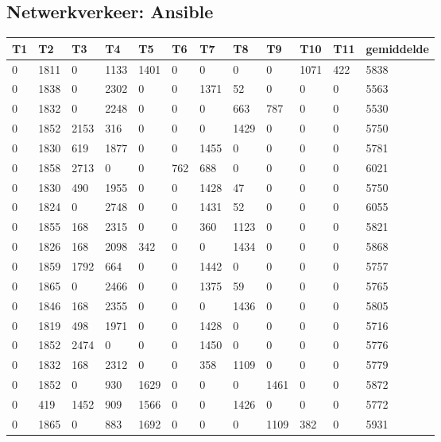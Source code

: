 \subsection*{Netwerkverkeer: Ansible}
\label{dataset:netwerkverkeer:ansible}
\begin{longtable}{ | l | l | l | l | l | l | l | l | l | l | l || l | }

	\hline
	T1 & T2 & T3 & T4 & T5 & T6 & T7 & T8 & T9 & T10 & T11 & gemiddelde  \\ \hline
	0 & 1811 & 0 & 1133 & 1401 & 0 & 0 & 0 & 0 & 1071 & 422 & 5838  \\ \hline
	0 & 1838 & 0 & 2302 & 0 & 0 & 1371 & 52 & 0 & 0 & 0 & 5563    \\ \hline
	0 & 1832 & 0 & 2248 & 0 & 0 & 0 & 663 & 787 & 0 & 0 & 5530 \\ \hline
	0 & 1852 & 2153 & 316 & 0 & 0 & 0 & 1429 & 0 & 0 & 0 & 5750  \\ \hline
	0 & 1830 & 619 & 1877 & 0 & 0 & 1455 & 0 & 0 & 0 & 0 & 5781  \\ \hline
	0 & 1858 & 2713 & 0 & 0 & 762 & 688 & 0 & 0 & 0 & 0 & 6021   \\ \hline
	0 & 1830 & 490 & 1955 & 0 & 0 & 1428 & 47 & 0 & 0 & 0 & 5750  \\ \hline
	0 & 1824 & 0 & 2748 & 0 & 0 & 1431 & 52 & 0 & 0 & 0 & 6055   \\ \hline
	0 & 1855 & 168 & 2315 & 0 & 0 & 360 & 1123 & 0 & 0 & 0 & 5821  \\ \hline
	0 & 1826 & 168 & 2098 & 342 & 0 & 0 & 1434 & 0 & 0 & 0 & 5868  \\ \hline
	0 & 1859 & 1792 & 664 & 0 & 0 & 1442 & 0 & 0 & 0 & 0 & 5757 \\ \hline
	0 & 1865 & 0 & 2466 & 0 & 0 & 1375 & 59 & 0 & 0 & 0 & 5765  \\ \hline
	0 & 1846 & 168 & 2355 & 0 & 0 & 0 & 1436 & 0 & 0 & 0 & 5805 \\ \hline
	0 & 1819 & 498 & 1971 & 0 & 0 & 1428 & 0 & 0 & 0 & 0 & 5716   \\ \hline
	0 & 1852 & 2474 & 0 & 0 & 0 & 1450 & 0 & 0 & 0 & 0 & 5776   \\ \hline
	0 & 1832 & 168 & 2312 & 0 & 0 & 358 & 1109 & 0 & 0 & 0 & 5779  \\ \hline
	0 & 1852 & 0 & 930 & 1629 & 0 & 0 & 0 & 1461 & 0 & 0 & 5872    \\ \hline
	0 & 419 & 1452 & 909 & 1566 & 0 & 0 & 1426 & 0 & 0 & 0 & 5772  \\ \hline
	0 & 1865 & 0 & 883 & 1692 & 0 & 0 & 0 & 1109 & 382 & 0 & 5931   \\ \hline

\end{longtable}
